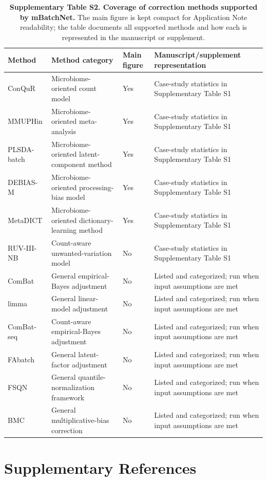 \documentclass[11pt,letterpaper]{article}
\begin{document}
\begin{table}[H]
\centering
\caption{\textbf{Supplementary Table S2. Coverage of correction methods supported by mBatchNet.} The main figure is kept compact for Application Note readability; the table documents all supported methods and how each is represented in the manuscript or supplement.}
\label{tab:method-coverage}
\begin{tabular}{llll}
\toprule
Method & Method category & Main figure & Manuscript/supplement representation \\
\midrule
ConQuR & Microbiome-oriented count model & Yes & Case-study statistics in Supplementary Table S1 \\
MMUPHin & Microbiome-oriented meta-analysis & Yes & Case-study statistics in Supplementary Table S1 \\
PLSDA-batch & Microbiome-oriented latent-component method & Yes & Case-study statistics in Supplementary Table S1 \\
DEBIAS-M & Microbiome-oriented processing-bias model & Yes & Case-study statistics in Supplementary Table S1 \\
MetaDICT & Microbiome-oriented dictionary-learning method & Yes & Case-study statistics in Supplementary Table S1 \\
RUV-III-NB & Count-aware unwanted-variation model & No & Case-study statistics in Supplementary Table S1 \\
ComBat & General empirical-Bayes adjustment & No & Listed and categorized; run when input assumptions are met \\
limma & General linear-model adjustment & No & Listed and categorized; run when input assumptions are met \\
ComBat-seq & Count-aware empirical-Bayes adjustment & No & Listed and categorized; run when input assumptions are met \\
FAbatch & General latent-factor adjustment & No & Listed and categorized; run when input assumptions are met \\
FSQN & General quantile-normalization framework & No & Listed and categorized; run when input assumptions are met \\
BMC & General multiplicative-bias correction & No & Listed and categorized; run when input assumptions are met \\
\bottomrule
\end{tabular}
\end{table}


\newpage
\section*{Supplementary References}
\label{sec:supp-refs}
\end{document}

